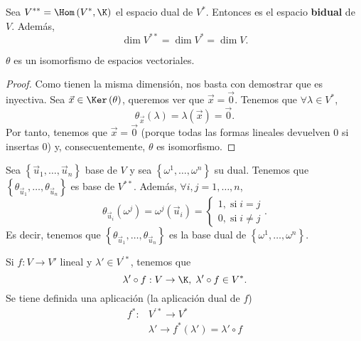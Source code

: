 \begin{fdefinition}[]
\normalfont Sea $\displaystyle V^{**} = \Hom\left(V^{*}, \K\right) $ el espacio dual de $\displaystyle V^{*} $. Entonces es el espacio \textbf{bidual} de $\displaystyle V $. Además, 
\[\dim V^{**} = \dim V^{*} = \dim V .\]
\end{fdefinition}

\begin{ftheorem}[]
\normalfont $\displaystyle \theta $ es un isomorfismo de espacios vectoriales.
\end{ftheorem}

\begin{proof}
Como tienen la misma dimensión, nos basta con demostrar que es inyectiva. Sea $\displaystyle \vec{x} \in \Ker\left(\theta \right) $, queremos ver que $\displaystyle \vec{x} = \vec{0} $. Tenemos que $\displaystyle \forall \lambda \in V^{*} $, 
\[\theta_{\vec{x}}\left(\lambda \right) = \lambda\left(\vec{x}\right) = \vec{0} .\]
Por tanto, tenemos que $\displaystyle \vec{x} = \vec{0} $ (porque todas las formas lineales devuelven 0 si insertas 0) y, consecuentemente, $\displaystyle \theta $ es isomorfismo.
\end{proof}

\begin{ftheorem}[]
	\normalfont Sea $\displaystyle \left\{ \vec{u}_{1}, \ldots, \vec{u}_{n}\right\}  $ base de $\displaystyle V $ y sea $\displaystyle \left\{ \omega^{1}, \ldots, \omega^{n}\right\}  $ su dual. Tenemos que $\displaystyle \left\{ \theta_{\vec{u}_{1}}, \ldots, \theta_{\vec{u}_{n}}\right\}  $ es base de $\displaystyle V^{**} $. Además, $\displaystyle \forall i, j= 1, \ldots, n $, 
	\[\theta_{\vec{u}_{i}}\left(\omega^{j}\right) = \omega^{j}\left(\vec{u}_{i}\right) =
	\begin{cases}
	1, \; \text{si} \; i = j \\
	0, \; \text{si} \; i \neq j
	\end{cases}
	.\]
	Es decir, tenemos que $\displaystyle \left\{ \theta_{\vec{u}_{1}}, \ldots, \theta_{\vec{u}_{n}}\right\}  $ es la base dual de $\displaystyle \left\{ \omega^{1}, \ldots, \omega^{n}\right\}  $.	
\end{ftheorem}

\begin{observation}
\normalfont Si $\displaystyle f: V \to V' $ lineal y $\displaystyle \lambda' \in V^{'*} $, tenemos que
\[\lambda'\circ f : V \to \K, \; \lambda'\circ f \in V^{*}.\]
Se tiene definida una aplicación (la aplicación dual de $\displaystyle f $) 
\[
\begin{split}
	f^{*} :& V^{'*} \to V^{*}\\
	& \lambda' \to f^{*}\left(\lambda '\right) = \lambda' \circ f
\end{split}
\]
\end{observation}

